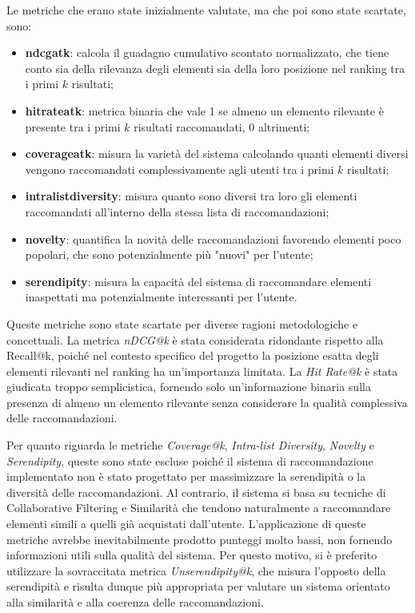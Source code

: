 Le metriche che erano state inizialmente valutate, ma che poi sono state scartate, sono:
\begin{itemize}
    \item \textbf{\gls{ndcgatk}}: calcola il guadagno cumulativo scontato normalizzato, che tiene conto sia della rilevanza degli elementi sia della loro posizione nel ranking tra i primi $k$ risultati;
    \item \textbf{\gls{hitrateatk}}: metrica binaria che vale 1 se almeno un elemento rilevante è presente tra i primi $k$ risultati raccomandati, 0 altrimenti;
    \item \textbf{\gls{coverageatk}}: misura la varietà del sistema calcolando quanti elementi diversi vengono raccomandati complessivamente agli utenti tra i primi $k$ risultati;
    \item \textbf{\gls{intralistdiversity}}: misura quanto sono diversi tra loro gli elementi raccomandati all'interno della stessa lista di raccomandazioni;
    \item \textbf{\gls{novelty}}: quantifica la novità delle raccomandazioni favorendo elementi poco popolari, che sono potenzialmente più "nuovi" per l'utente;
    \item \textbf{\gls{serendipity}}: misura la capacità del sistema di raccomandare elementi inaspettati ma potenzialmente interessanti per l'utente.
\end{itemize}

Queste metriche sono state scartate per diverse ragioni metodologiche e concettuali. La metrica \emph{nDCG@k} è stata considerata ridondante rispetto alla Recall@k, poiché nel contesto specifico del progetto la posizione esatta degli elementi rilevanti nel ranking ha un'importanza limitata. La \emph{Hit Rate@k} è stata giudicata troppo semplicistica, fornendo solo un'informazione binaria sulla presenza di almeno un elemento rilevante senza considerare la qualità complessiva delle raccomandazioni.

Per quanto riguarda le metriche \emph{Coverage@k}, \emph{Intra-list Diversity}, \emph{Novelty} e \emph{Serendipity}, queste sono state escluse poiché il sistema di raccomandazione implementato non è stato progettato per massimizzare la serendipità o la diversità delle raccomandazioni. Al contrario, il sistema si basa su tecniche di Collaborative Filtering e Similarità che tendono naturalmente a raccomandare elementi simili a quelli già acquistati dall'utente. L'applicazione di queste metriche avrebbe inevitabilmente prodotto punteggi molto bassi, non fornendo informazioni utili sulla qualità del sistema. Per questo motivo, si è preferito utilizzare la sovraccitata metrica \emph{Unserendipity@k}, che misura l'opposto della serendipità e risulta dunque più appropriata per valutare un sistema orientato alla similarità e alla coerenza delle raccomandazioni.


